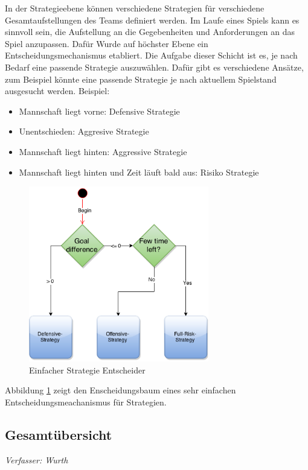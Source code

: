 \documentclass[fontsize=12pt,a4paper,final]{scrartcl}[2003/01/01]
\begin{document}
In der Strategieebene können verschiedene Strategien für verschiedene Gesamtaufstellungen des Teams definiert werden. Im Laufe eines Spiels kann es sinnvoll sein, die Aufstellung an die Gegebenheiten und Anforderungen an das Spiel anzupassen. Dafür Wurde auf höchster Ebene ein Entscheidungsmechanismus etabliert. Die Aufgabe dieser Schicht ist es, je nach Bedarf eine passende Strategie auszuwählen. Dafür gibt es verschiedene Ansätze, zum Beispiel könnte eine passende Strategie je nach aktuellem Spielstand ausgesucht werden. Beispiel: 
\begin{itemize}
\item Mannschaft liegt vorne: Defensive Strategie
\item Unentschieden: Aggresive Strategie
\item Mannschaft liegt hinten: Aggressive Strategie
\item Mannschaft liegt hinten und Zeit läuft bald aus: Risiko Strategie
\end{itemize}

\begin{figure}[H]
	\centering
	\includegraphics[width=0.7\textwidth]{Grafiken/KI/SimpleStrategyDecider}
	\caption{Einfacher Strategie Entscheider}
	\label{Einfacher Strategie Entscheider}
\end{figure}

Abbildung \ref{Einfacher Strategie Entscheider} zeigt den Enscheidungsbaum eines sehr einfachen Entscheidungsmeachanismus für Strategien.

\subsection{Gesamtübersicht}\label{sse:KI-Gesamtübersicht}
\textit{Verfasser: Wurth}\\
\end{document}
